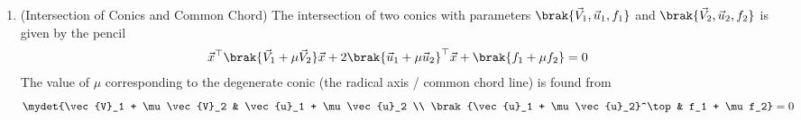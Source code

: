 \begin{enumerate}[label=\thesubsection.\arabic*, ref=\thesubsection.\theenumi,itemsep=0pt]
\begin{align}
\end{align}

where 
\begin{align}
\kappa_i = \frac{-\vec{m}^\top \brak{\vec{V}\vec{h} + \vec{u}} \pm \sqrt{\sbrak{\vec{m}^\top \brak{\vec{V}\vec{h} + \vec{u}}}^2 - g\brak{\vec{h}}\brak{\vec{m}^\top \vec{V} \vec{m}}}}{\vec{m}^\top \vec{V} \vec{m}}, i = 1,2.
\label{eq:EE26BTECH11213-conic_kappa_roots}
\end{align}
with $g\brak{\vec{h}} = \vec{h}^\top \vec{V} \vec{h} + 2\vec{u}^\top \vec{h} + f$.
%

\item (Intersection of Conics and Common Chord)
 The intersection of two conics with parameters $\brak{\vec{V}_1, \vec{u}_1, f_1}$ and $\brak{\vec{V}_2, \vec{u}_2, f_2}$ is given by the pencil
\begin{align}
\vec{x}^\top \brak{\vec{V}_1 + \mu \vec{V}_2}\vec{x} + 2\brak{\vec{u}_1 + \mu \vec{u}_2}^\top \vec{x} + \brak{f_1 + \mu f_2} = 0 \label{eq:EE26BTECH11213-pencil_conics}
\end{align}
The value of $\mu$ corresponding to the degenerate conic (the radical axis / common chord line) is found from
\begin{align}
\mydet{\vec{V}_1 + \mu \vec{V}_2 & \vec{u}_1 + \mu \vec{u}_2 \\ \brak{\vec{u}_1 + \mu \vec{u}_2}^\top & f_1 + \mu f_2} = 0 \label{eq:EE26BTECH11213-pencil_det_zero}
\end{align}


\end{enumerate}
